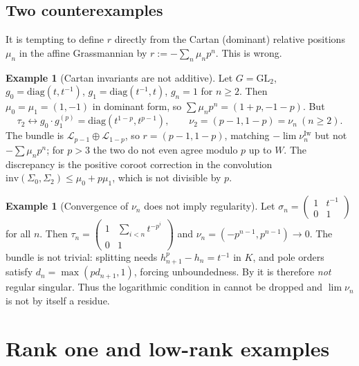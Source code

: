 \documentclass[11pt,reqno]{amsart}
\newcommand{\cL}{\mathcal{L}}
\newcommand{\inv}{\mathrm{inv}}
\newcommand{\Iw}{\mathrm{Iw}}
\theoremstyle{plain}
\theoremstyle{definition}
\newtheorem{example}[theorem]{Example}
\theoremstyle{remark}
\numberwithin{equation}{section}
\begin{document}
\subsection{Two counterexamples}
It is tempting to define $r$ directly from the Cartan (dominant) relative
positions $\mu_n$ in the affine Grassmannian by $r:=-\sum_n\mu_np^n$.
This is wrong.

\begin{example}[Cartan invariants are not additive]\label{ex:cartanfails}
Let $G=\mathrm{GL}_2$, $g_0=\mathrm{diag}(t,t^{-1})$,
$g_1=\mathrm{diag}(t^{-1},t)$, $g_n=1$ for $n\ge2$.  Then
$\mu_0=\mu_1=(1,-1)$ in dominant form, so
$\sum\mu_np^n=(1+p,-1-p)$.  But
\[
   \tau_2\leftrightarrow g_0\cdot g_1^{(p)}=\mathrm{diag}(t^{1-p},t^{p-1}),
   \qquad \nu_2=(p-1,1-p)=\nu_n\ (n\ge2).
\]
The bundle is $\cL_{p-1}\oplus\cL_{1-p}$, so $r=(p-1,1-p)$, matching
$-\lim\nu^{\Iw}_n$ but not $-\sum\mu_np^n$; for $p>3$ the two do not even
agree modulo $p$ up to $W$.  The discrepancy is the positive coroot
correction in the convolution
$\inv(\Sigma_0,\Sigma_2)\le\mu_0+p\mu_1$, which is not divisible by
$p$.
\end{example}

\begin{example}[Convergence of $\nu_n$ does not imply regularity]\label{ex:irregular}
Let $\sigma_n=\begin{pmatrix}1&t^{-1}\\0&1\end{pmatrix}$ for all $n$.
Then $\tau_n=\begin{pmatrix}1&\sum_{i<n}t^{-p^i}\\0&1\end{pmatrix}$ and
$\nu_n=(-p^{n-1},p^{n-1})\to0$.  The bundle is not trivial: splitting
needs $h_{n+1}^p-h_n=t^{-1}$ in $K$, and pole orders satisfy
$d_n=\max(pd_{n+1},1)$, forcing unboundedness.  By
 it is therefore \emph{not} regular singular.
Thus the logarithmic condition in  cannot be dropped and
$\lim\nu_n$ is not by itself a residue.
\end{example}

\section{Rank one and low-rank examples}\label{sec:examples}
\end{document}
